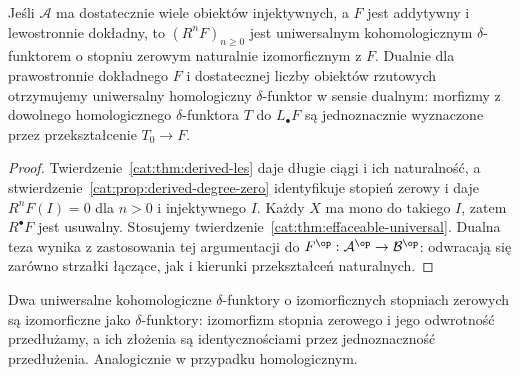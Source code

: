 \begin{wniosek}\label{cat:cor:derived-universal}
Jeśli $\mathcal A$ ma dostatecznie wiele obiektów injektywnych, a $F$ jest addytywny i lewostronnie dokładny, to $(R^nF)_{n\ge0}$ jest uniwersalnym kohomologicznym $\delta$-funktorem o stopniu zerowym naturalnie izomorficznym z $F$. Dualnie dla prawostronnie dokładnego $F$ i dostatecznej liczby obiektów rzutowych otrzymujemy uniwersalny homologiczny $\delta$-funktor w sensie dualnym: morfizmy z dowolnego homologicznego $\delta$-funktora $T$ do $L_\bullet F$ są jednoznacznie wyznaczone przez przekształcenie $T_0\to F$.
\end{wniosek}
\begin{proof}
Twierdzenie~\ref{cat:thm:derived-les} daje długie ciągi i ich naturalność, a stwierdzenie~\ref{cat:prop:derived-degree-zero} identyfikuje stopień zerowy i daje $R^nF(I)=0$ dla $n>0$ i injektywnego $I$. Każdy $X$ ma mono do takiego $I$, zatem $R^\bullet F$ jest usuwalny. Stosujemy twierdzenie~\ref{cat:thm:effaceable-universal}. Dualna teza wynika z zastosowania tej argumentacji do $F^{\op}:\mathcal A^{\op}\to\mathcal B^{\op}$: odwracają się zarówno strzałki łączące, jak i kierunki przekształceń naturalnych.
\end{proof}
\begin{uwaga}
Dwa uniwersalne kohomologiczne $\delta$-funktory o izomorficznych stopniach zerowych są izomorficzne jako $\delta$-funktory: izomorfizm stopnia zerowego i jego odwrotność przedłużamy, a ich złożenia są identycznościami przez jednoznaczność przedłużenia. Analogicznie w przypadku homologicznym.
\end{uwaga}

